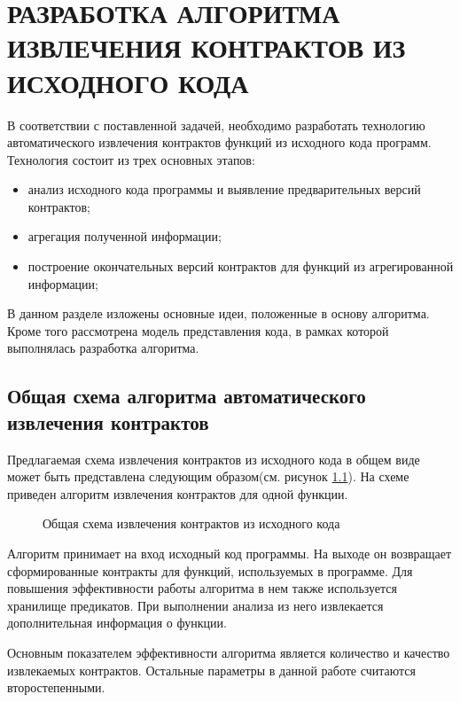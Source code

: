 \chapter{РАЗРАБОТКА АЛГОРИТМА ИЗВЛЕЧЕНИЯ КОНТРАКТОВ ИЗ ИСХОДНОГО КОДА}
\label{chapter:algoritm}
В соответствии с поставленной задачей, необходимо разработать технологию автоматического извлечения контрактов функций из исходного кода программ. Технология состоит из трех основных этапов:
\begin{itemize}
\item анализ исходного кода программы и выявление предварительных версий контрактов;
\item агрегация полученной информации;
\item построение окончательных версий контрактов для функций из агрегированной  информации;
\end{itemize}

В данном разделе изложены основные идеи, положенные в основу алгоритма. Кроме того рассмотрена модель представления кода, в рамках которой выполнялась разработка алгоритма.

\section{Общая схема алгоритма автоматического извлечения контрактов}
Предлагаемая схема извлечения контрактов из исходного кода в общем виде может быть представлена следующим образом(см. рисунок \ref{image:generalScheme}). На схеме приведен алгоритм извлечения контрактов для одной функции.
\begin{figure}[h!]
\caption{Общая схема извлечения контрактов из исходного кода}
\label{image:generalScheme}
\end{figure}

Алгоритм принимает на вход исходный код программы. На выходе он возвращает сформированные контракты для функций, используемых в программе. Для повышения эффективности работы алгоритма в нем также используется хранилище предикатов. При выполнении анализа из него извлекается дополнительная информация о функции.

Основным показателем эффективности алгоритма является количество и качество извлекаемых контрактов. Остальные параметры в данной работе считаются второстепенными.

